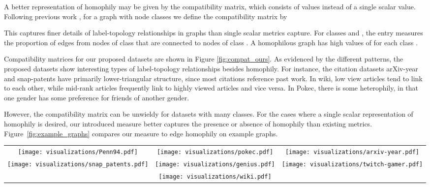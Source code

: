 \documentclass{article}
\begin{document}
A better representation of homophily may be given by the compatibility matrix, which consists of  values instead of a single scalar value. Following previous work \cite{zhu2020beyond}, for a graph  with  node classes we define the  compatibility matrix  by


This captures finer details of label-topology relationships in graphs than single scalar metrics capture. For classes  and , the entry  measures the proportion of edges from nodes of class  that are connected to nodes of class . A homophilous graph has high values of  for each class .

Compatibility matrices for our proposed datasets are shown in Figure \ref{fig:compat_ours}. As evidenced by the different patterns, the proposed datasets show interesting types of label-topology relationships besides homophily. For instance, the citation datasets arXiv-year and snap-patents have primarily lower-triangular structure, since most citations reference past work. In wiki, low view articles tend to link to each other, while mid-rank articles frequently link to highly viewed articles and vice versa. In Pokec, there is some heterophily, in that one gender has some preference for friends of another gender.

However, the compatibility matrix can be unwieldy for datasets with many classes. For the cases where a single scalar representation of homophily is desired, our introduced measure better captures the presence or absence of homophily than existing metrics. Figure~\ref{fig:example_graphs} compares our measure  to edge homophily on example graphs.


\begin{figure*}
\centering
\begin{tabular}{ccc}
    \texttt{[image: visualizations/Penn94.pdf]} & 
    \texttt{[image: visualizations/pokec.pdf]} &
    \texttt{[image: visualizations/arxiv-year.pdf]} \\
    \texttt{[image: visualizations/snap\_patents.pdf]} &
    \texttt{[image: visualizations/genius.pdf]} &
    \texttt{[image: visualizations/twitch-gamer.pdf]} \\
    & \texttt{[image: visualizations/wiki.pdf]}
\end{tabular}
\caption{Compatibility matrices of our proposed datasets. These datasets from a variety of different contexts exhibit a wide range of non-homophilous structures.}
\label{fig:compat_ours}
\end{figure*}
\end{document}
